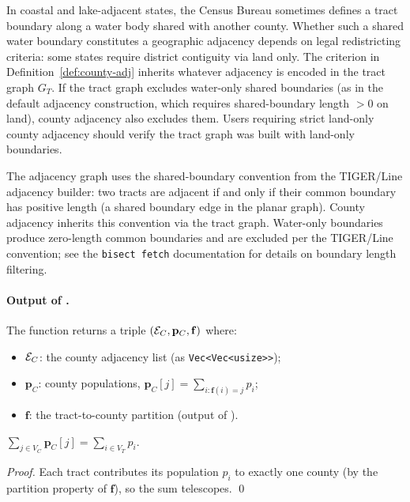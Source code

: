 \begin{remark}
\label{rem:water}
In coastal and lake-adjacent states, the Census Bureau sometimes defines
a tract boundary along a water body shared with another county.
Whether such a shared water boundary constitutes a geographic adjacency
depends on legal redistricting criteria: some states require district
contiguity via land only.
The criterion in Definition~\ref{def:county-adj} inherits whatever
adjacency is encoded in the tract graph $G_T$.
If the tract graph excludes water-only shared boundaries (as in the
\redist{} default adjacency construction, which requires
shared-boundary length $> 0$ on land), county adjacency also excludes
them.
Users requiring strict land-only county adjacency should verify the
tract graph was built with land-only boundaries.
\end{remark}

\begin{remark}
\label{rem:tiger}
The adjacency graph uses the shared-boundary convention from the
TIGER/Line adjacency builder: two tracts are adjacent if and only if
their common boundary has positive length (a shared boundary edge in the
planar graph).
County adjacency inherits this convention via the tract graph.
Water-only boundaries produce zero-length common boundaries and are
excluded per the TIGER/Line convention; see the \texttt{bisect fetch}
documentation for details on boundary length filtering.
\end{remark}

\paragraph{Output of \buildc{}.}
The function returns a triple $(\mathcal{E}_C, \mathbf{p}_C, \mathbf{f})$ where:
\begin{itemize}
  \item $\mathcal{E}_C$: the county adjacency list (as \texttt{Vec<Vec<usize>>});
  \item $\mathbf{p}_C$: county populations, $\mathbf{p}_C[j] = \sum_{i: \mathbf{f}(i)=j} p_i$;
  \item $\mathbf{f}$: the tract-to-county partition (output of \derive{}).
\end{itemize}

\begin{proposition}
\label{prop:pop}
$\sum_{j \in V_C} \mathbf{p}_C[j] = \sum_{i \in V_T} p_i$.
\end{proposition}
\begin{proof}
Each tract contributes its population $p_i$ to exactly one county
(by the partition property of $\mathbf{f}$), so the sum telescopes. \qed
\end{proof}


